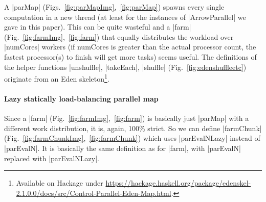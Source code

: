 A |parMap| (Figs.~\ref{fig:parMapImg},~\ref{fig:parMap}) spawns every single computation in a new thread (at least for the instances of |ArrowParallel| we gave in this paper). This can be quite wasteful and a |farm| (Fig.~\ref{fig:farmImg},~\ref{fig:farm}) that equally distributes the workload over |numCores| workers (if numCores is greater than the actual processor count, the fastest processor(s) to finish will get more tasks) seems useful.
The definitions of the helper functions |unshuffle|, |takeEach|, |shuffle| (Fig.~\ref{fig:edenshuffleetc}) originate from an Eden skeleton\footnote{Available on Hackage under \url{https://hackage.haskell.org/package/edenskel-2.1.0.0/docs/src/Control-Parallel-Eden-Map.html}.}.

\paragraph{Lazy statically load-balancing parallel map}
Since a |farm| (Fig.~\ref{fig:farmImg},~\ref{fig:farm}) is basically just |parMap| with a different work distribution, it is, again, 100\% strict. So we can define |farmChunk| (Fig.~\ref{fig:farmChunkImg},~\ref{fig:farmChunk}) which uses |parEvalNLazy| instead of |parEvalN|. It is basically the same definition as for |farm|, with |parEvalN| replaced with |parEvalNLazy|.

